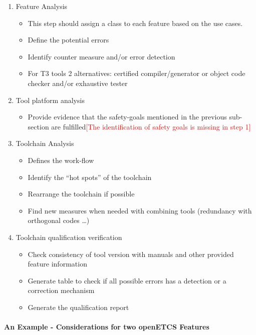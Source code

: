 \begin{enumerate}
\item Feature Analysis
  \begin{itemize}
  \item This step should assign a class to each feature based on the use cases.
  \item Define the potential errors
  \item Identify counter measure and/or error detection
  \item For T3 tools 2 alternatives:  certified compiler/generator or
    object code checker and/or exhaustive tester
  \end{itemize}
\item Tool platform  analysis 
  \begin{itemize}
  \item Provide evidence that the safety-goals mentioned in the
    previous sub-section are fulfilled\textcolor{red}{[The identification of safety goals is missing in step 1]}
  \end{itemize}
\item Toolchain Analysis
  \begin{itemize}
  \item Defines the work-flow
  \item Identify the ``hot spots'' of the toolchain
  \item Rearrange the toolchain if possible
  \item Find new measures when needed with combining tools (redundancy with orthogonal
    codes \ldots{})
  \end{itemize}
\item Toolchain qualification verification 
  \begin{itemize}
  \item Check consistency of tool version with  manuals and other
    provided feature information
  \item Generate table to  check if all possible errors has a
    detection or a correction mechanism
\item Generate the qualification report
  \end{itemize}

\end{enumerate}


\paragraph{An Example - Considerations for two openETCS Features}

